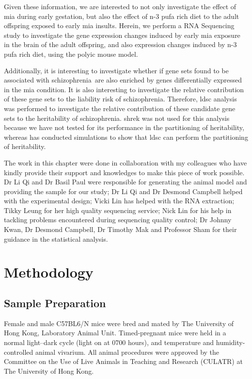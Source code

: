 \documentclass[12pt]{scrbook}
\newcommand*{\scz}{schizophrenia}
\begin{document}
Given these information, we are interested to not only investigate the effect of \gls{mia} during early gestation, but also the effect of n-3 \gls{pufa} rich diet to the adult offspring exposed to early \gls{mia} insults. 
Herein, we perform a RNA Sequencing study to investigate the gene expression changes induced by early \gls{mia} exposure in the brain of the adult offspring, and also expression changes induced by n-3 \gls{pufa} rich diet, using the \gls{polyic} mouse model.

Additionally, it is interesting to investigate whether if gene sets found to be associated with \scz\ are also enriched by genes differentially expressed in the \gls{mia} condition. 
It is also interesting to investigate the relative contribution of these gene sets to the liability risk of \scz. 
Therefore, \gls{ldsc} analysis was performed to investigate the relative contribution of these candidate gene sets to the heritability of \scz.
\gls{shrek} was not used for this analysis because we have not tested for its performance in the partitioning of heritability, whereas \citet{Finucane2015} has conducted simulations to show that \gls{ldsc} can perform the partitioning of heritability.

The work in this chapter were done in collaboration with my colleagues who have kindly provide their support and knowledges to make this piece of work possible.
Dr Li Qi and Dr Basil Paul were responsible for generating the animal model and providing the sample for our study;
Dr Li Qi and Dr Desmond Campbell helped with the experimental design;
Vicki Lin has helped with the RNA extraction; 
Tikky Leung for her high quality sequencing service;
Nick Lin for his help in tackling problems encountered during sequencing quality control; 
Dr Johnny Kwan, Dr Desmond Campbell, Dr Timothy Mak and Professor Sham for their guidance in the statistical analysis.

\section{Methodology}
\subsection{Sample Preparation}
Female and male C57BL6/N mice were bred and mated by The University of Hong Kong, Laboratory Animal Unit. 
Timed-pregnant mice were held in a normal light–dark cycle (light on at 0700 hours), and temperature and humidity-controlled animal vivarium. 
All animal procedures were approved by the Committee on the Use of Live Animals in Teaching and Research (CULATR) at The University of Hong Kong.
\end{document}
